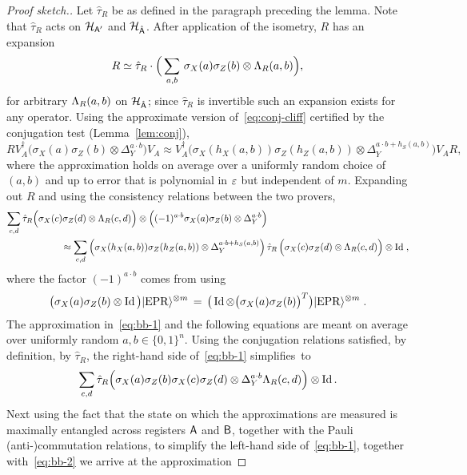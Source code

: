 \begin{proof}[Proof sketch.]
Let $\hat{\tau}_R$ be as defined in the paragraph preceding the lemma. Note that $\hat{\tau}_R$ acts on $\mathcal{H}_{{\textsf{A}}'}$ and $\mathcal{H}_{\hat{{\textsf{A}}}}$. After application of the isometry, $R$ has an expansion
\begin{equation}\label{eq:r-1}
R \simeq \hat{\tau}_R \cdot \Big(\sum_{a,b} \,\sigma_X(a)\sigma_Z(b) \otimes \Lambda_R(a,b)\Big),
\end{equation}
 for arbitrary $\Lambda_R(a,b)$ on $\mathcal{H}_{\hat{{\textsf{A}}}}$; since $\hat{\tau}_R $ is invertible such an expansion exists for any operator. 
Using the approximate version of~\eqref{eq:conj-cliff} certified by the conjugation test (Lemma~\ref{lem:conj}), 
$$ R V_A^\dagger \big(\sigma_X(a)\sigma_Z(b)\otimes \Delta_Y^{a\cdot b}\big) V_A \approx V_A^\dagger \big(\sigma_X(h_X(a,b))\sigma_Z(h_Z(a,b)) \otimes \Delta_Y^{a\cdot b + h_S(a,b)}\big)V_A R,$$
where the approximation holds on average over a uniformly random choice of $(a,b)$ and up to error that is polynomial in $\varepsilon$ but independent of $m$. 
Expanding out $R$ and using the consistency relations between the two provers, 
\begin{align}
\sum_{c,d} \hat{\tau}_R \Big(\sigma_X(c)\sigma_Z(d) &\otimes \phase_R(c,d)\Big) \otimes \Big((-1)^{a\cdot b}\sigma_X(a)\sigma_Z(b)\otimes \Delta_Y^{a\cdot b}\Big)\notag\\
& \!\!\!\!\!\!\!\!\!\!\!\!\!\!\!\!\approx \sum_{c,d} \Big(\sigma_X(h_X(a,b))\sigma_Z(h_Z(a,b)) \otimes \Delta_Y^{a\cdot b + h_S(a,b)}\Big) \,\hat{\tau}_R \, \Big(\sigma_X(c)\sigma_Z(d) \otimes \phase_R(c,d)\Big) \otimes \Id\;,\label{eq:bb-1}
\end{align}
where the factor $(-1)^{a\cdot b}$ comes from using 
$$\big(\sigma_X(a)\sigma_Z(b)\otimes \mathop{\rm Id}\nolimits\big) |{\rm EPR}\rangle^{\otimes m} \,=\, \big(\mathop{\rm Id}\nolimits \otimes \big(\sigma_X(a)\sigma_Z(b)\big)^T \big)|{\rm EPR}\rangle^{\otimes m}\;.$$
The approximation in~\eqref{eq:bb-1} and the following equations are meant on average over uniformly random $a,b\in\{0,1\}^n$.
Using the conjugation relations satisfied, by definition, by $\hat{\tau}_R$,  the right-hand side of~\eqref{eq:bb-1} simplifies~to 
\begin{equation}\label{eq:bb-2}
\sum_{c,d} \hat{\tau}_R \Big(\sigma_X(a)\sigma_Z(b) \sigma_X(c)\sigma_Z(d) \otimes \Delta_Y^{a\cdot b }\Lambda_R(c,d)\Big)  \otimes \mathop{\rm Id}\nolimits.
\end{equation}
Next using the fact that the state on which the approximations are measured is maximally entangled across registers ${\textsf{A}}$ and ${\textsf{B}}$, together with the Pauli (anti-)commutation relations, to simplify the left-hand side of~\eqref{eq:bb-1}, together with~\eqref{eq:bb-2} we arrive at the approximation

\end{proof}
